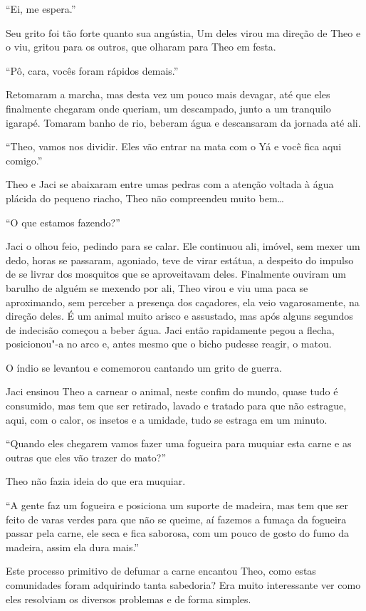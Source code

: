 ``Ei, me espera.''

Seu grito foi tão forte quanto sua angústia, Um deles virou ma direção
de Theo e o viu, gritou para os outros, que olharam para Theo em festa.

``Pô, cara, vocês foram rápidos demais.''

Retomaram a marcha, mas desta vez um pouco mais devagar, até que eles
finalmente chegaram onde queriam, um descampado, junto a um tranquilo
igarapé. Tomaram banho de rio, beberam água e descansaram da jornada até
ali.

``Theo, vamos nos dividir. Eles vão entrar na mata com o Yá e você fica
aqui comigo.''

Theo e Jaci se abaixaram entre umas pedras com a atenção voltada à água
plácida do pequeno riacho, Theo não compreendeu muito bem\ldots{}

``O que estamos fazendo?''

Jaci o olhou feio, pedindo para se calar. Ele continuou ali, imóvel, sem
mexer um dedo, horas se passaram, agoniado, teve de virar estátua, a
despeito do impulso de se livrar dos mosquitos que se aproveitavam
deles. Finalmente ouviram um barulho de alguém se mexendo por ali, Theo
virou e viu uma paca se aproximando, sem perceber a presença dos
caçadores, ela veio vagarosamente, na direção deles. É um animal muito
arisco e assustado, mas após alguns segundos de indecisão começou a
beber água. Jaci então rapidamente pegou a flecha, posicionou"-a no arco
e, antes mesmo que o bicho pudesse reagir, o matou.

O índio se levantou e comemorou cantando um grito de guerra.

Jaci ensinou Theo a carnear o animal, neste confim do mundo, quase tudo
é consumido, mas tem que ser retirado, lavado e tratado para que não
estrague, aqui, com o calor, os insetos e a umidade, tudo se estraga em
um minuto.

``Quando eles chegarem vamos fazer uma fogueira para muquiar esta carne e
as outras que eles vão trazer do mato?''

Theo não fazia ideia do que era muquiar.

``A gente faz um fogueira e posiciona um suporte de madeira, mas tem que
ser feito de varas verdes para que não se queime, aí fazemos a fumaça da
fogueira passar pela carne, ele seca e fica saborosa, com um pouco de
gosto do fumo da madeira, assim ela dura mais.''

Este processo primitivo de defumar a carne encantou Theo, como estas
comunidades foram adquirindo tanta sabedoria? Era muito interessante ver
como eles resolviam os diversos problemas e de forma simples.

